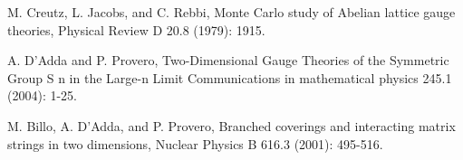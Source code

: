\documentclass[9pt,twocolumn,twoside]{article}
\begin{document}

\begin{thebibliography}{9}

	M. Creutz, L. Jacobs, and C. Rebbi, 
	Monte Carlo study of Abelian lattice gauge theories, 
	Physical Review D 20.8 (1979): 1915.

	A. D’Adda and P. Provero,
	Two-Dimensional Gauge Theories of the Symmetric Group S n in the Large-n Limit
	Communications in mathematical physics 245.1 (2004): 1-25.

	M. Billo, A. D'Adda, and P. Provero,
	Branched coverings and interacting matrix strings in two dimensions,
	Nuclear Physics B 616.3 (2001): 495-516.


\end{thebibliography}
\end{document}
